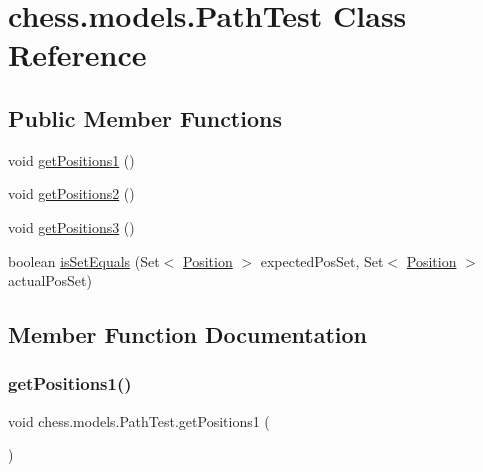 \hypertarget{classchess_1_1models_1_1_path_test}{}\section{chess.\+models.\+Path\+Test Class Reference}
\label{classchess_1_1models_1_1_path_test}
\subsection*{Public Member Functions}
\begin{DoxyCompactItemize}
\item 
void \mbox{\hyperlink{classchess_1_1models_1_1_path_test_af8658336e6ffed8c20de620ad12a37e3}{get\+Positions1}} ()
\item 
void \mbox{\hyperlink{classchess_1_1models_1_1_path_test_a572cc15adf7eb579533b04040f14fc41}{get\+Positions2}} ()
\item 
void \mbox{\hyperlink{classchess_1_1models_1_1_path_test_a42e6278bdbd086dbb1394c8bf873a0af}{get\+Positions3}} ()
\item 
boolean \mbox{\hyperlink{classchess_1_1models_1_1_path_test_a6c2cec1f3d389067e84ff5fe93a6b6a8}{is\+Set\+Equals}} (Set$<$ \mbox{\hyperlink{classchess_1_1models_1_1_position}{Position}} $>$ expected\+Pos\+Set, Set$<$ \mbox{\hyperlink{classchess_1_1models_1_1_position}{Position}} $>$ actual\+Pos\+Set)
\end{DoxyCompactItemize}


\subsection{Member Function Documentation}
\mbox{\label{classchess_1_1models_1_1_path_test_af8658336e6ffed8c20de620ad12a37e3}} 
\subsubsection{\texorpdfstring{get\+Positions1()}{getPositions1()}}
{\footnotesize\ttfamily void chess.\+models.\+Path\+Test.\+get\+Positions1 (\begin{DoxyParamCaption}{ }\end{DoxyParamCaption})}

